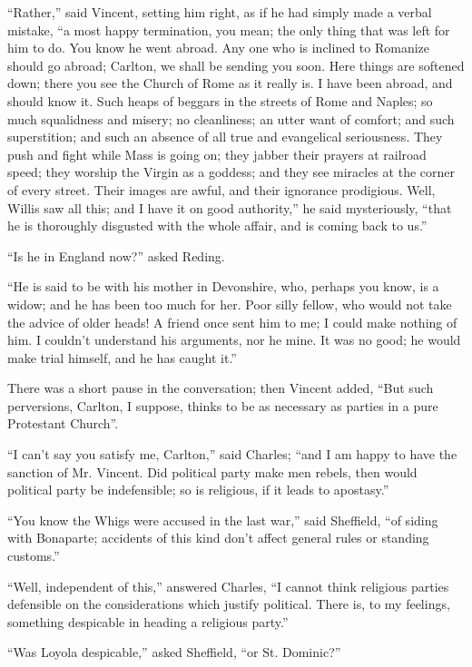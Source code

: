 ``Rather,'' said Vincent, setting him right, as if he had
simply made a verbal mistake, ``a most happy termination, you
mean; the only thing that was left for him to do. You know he went
abroad. Any one who is inclined to Romanize should go abroad;
Carlton, we shall be sending you soon. Here things are softened down;
there you see the Church of Rome as it really is. I have been abroad,
and should know it. Such heaps of beggars in the streets of Rome and
Naples; so much squalidness and misery; no cleanliness; an utter want
of comfort; and such superstition; and such an absence of all true and
evangelical seriousness. They push and fight while Mass is going on;
they jabber their prayers at railroad speed; they worship the Virgin
as a goddess; and they see miracles at the corner of every street.
Their images are awful, and their ignorance prodigious. Well, Willis
saw all this; and I have it on good authority,'' he said
mysteriously, ``that he is thoroughly disgusted with the whole
affair, and is coming back to us.''

``Is he in England now?'' asked Reding.

``He is said to be with his mother in Devonshire, who, perhaps
you know, is a widow; and he has been too much for her. Poor silly
fellow, who would not take the advice of older heads! A friend once
sent him to me; I could make nothing of him. I couldn't understand his
arguments, nor he mine. It was no good; he would make trial himself,
and he has caught it.''

There was a short pause in the conversation; then Vincent added,
``But such perversions, Carlton, I suppose, thinks to be as
necessary as parties in a pure Protestant Church''.

``I can't say you satisfy me, Carlton,'' said Charles;
``and I am happy to have the sanction of Mr. Vincent. Did
political party make men rebels, then would political party be
indefensible; so is religious, if it leads to apostasy.''

``You know the Whigs were accused in the last war,'' said
Sheffield, ``of siding with Bonaparte; accidents of this kind don't
affect general rules or standing customs.''

``Well, independent of this,'' answered Charles, ``I
cannot think religious parties defensible on the considerations which
justify political. There is, to my feelings, something despicable in
heading a religious party.''

``Was Loyola despicable,'' asked Sheffield, ``or St.
Dominic?''

